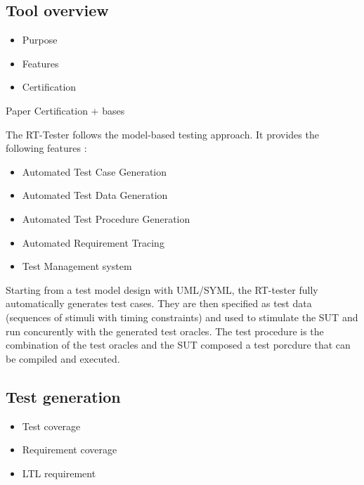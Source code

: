 \subsection{Tool overview}
\begin{itemize}
\item Purpose
\item Features
\item Certification
\end{itemize}
Paper Certification + bases

The RT-Tester follows the model-based testing approach. 
It provides the following features :
\begin{itemize}
\item Automated Test Case Generation 
\item Automated Test Data Generation 
\item Automated Test Procedure Generation 
\item Automated Requirement Tracing 
\item Test Management system 
\end{itemize}
Starting from a test model design with UML/SYML, the RT-tester fully
automatically generates test cases. They are then specified as test data
(sequences of stimuli with timing constraints) and used to stimulate the SUT and
run concurently with the generated test oracles. The test procedure is the
combination of the test oracles and the SUT composed a test porcdure that can be
compiled and executed.



\subsection{Test generation}
\begin{itemize}
\item Test coverage
\item Requirement coverage
\item LTL requirement
\end{itemize}
